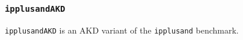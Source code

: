 \subsubsection{\tt ipplusandAKD}
\label{benchmarkipplusandAKD}

{\tt ipplusandAKD} is an AKD variant of the {\tt ipplusand} benchmark.
